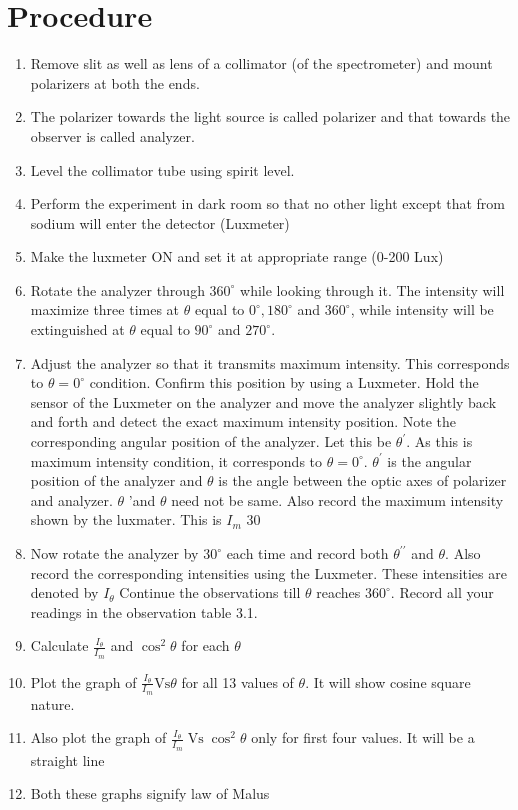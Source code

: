 \documentclass[11pt]{article}
\begin{document}
	\section{Procedure}
	
	\begin{enumerate}
	
	
	
	
	\item Remove slit as well as lens of a collimator (of the spectrometer) and mount polarizers at both the ends.
	\item The polarizer towards the light source is called polarizer and that towards the observer is called analyzer.
	\item Level the collimator tube using spirit level.
	\item Perform the experiment in dark room so that no other light except that from sodium will enter the detector (Luxmeter)
	\item Make the luxmeter $\mathrm{ON}$ and set it at appropriate range (0-200 Lux)
	\item Rotate the analyzer through $360^{\circ}$ while looking through it. The intensity will maximize three times at $\theta$ equal to $0^{\circ}, 180^{\circ}$ and $360^{\circ}$, while intensity will be extinguished at $\theta$ equal to $90^{\circ}$ and $270^{\circ}$.
	
	\item Adjust the analyzer so that it transmits maximum intensity. This corresponds to $\theta=0^{\circ}$ condition. Confirm this position by using a Luxmeter. Hold the sensor of the Luxmeter on the analyzer and move the analyzer slightly back and forth and detect the exact maximum intensity position. Note the corresponding angular position of the analyzer. Let this be $\theta^{\prime}$. As this is maximum intensity condition, it corresponds to $\theta=0^{\circ}$. $\theta^{\prime}$ is the angular position of the analyzer and $\theta$ is the angle between the optic axes of polarizer and analyzer. $\theta$ 'and $\theta$ need not be same. Also record the maximum intensity shown by the luxmater. This is $I_{m}$
	30
	
	\item Now rotate the analyzer by $30^{\circ}$ each time and record both $\theta^{\prime \prime}$ and $\theta$. Also record the corresponding intensities using the Luxmeter. These intensities are denoted by $I_{\theta}$ Continue the observations till $\theta$ reaches $360^{\circ}$. Record all your readings in the observation table 3.1.
	\item Calculate $\frac{I_{\theta}}{I_{m}}$ and $\cos ^{2} \theta$ for each $\theta$
	\item Plot the graph of $\frac{I_{\theta}}{I_{m}} \mathrm{Vs} \theta$ for all 13 values of $\theta$. It will show cosine square nature.
	\item Also plot the graph of $\frac{I_{\theta}}{I_{m}} \operatorname{Vs} \cos ^{2} \theta$ only for first four values. It will be a straight line
	\item Both these graphs signify law of Malus
	
	
	

	\end{enumerate}
\clearpage
\end{document}
